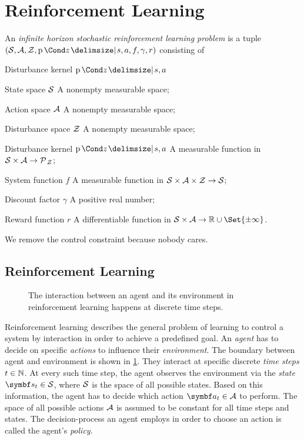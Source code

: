 \section{Reinforcement Learning}
\label{sec:reinforcement_learning:reinforcement_learning}
\parencite{bertsekas_stochastic_1978}

\begin{definition}
    An \emph{infinite horizon stochastic reinforcement learning problem} is a tuple $(\Sc, \Ac, \Zc, \Prob{z \given s, a}, f, \gamma, r)$ consisting of
    \begin{labeling}{Disturbance kernel $\Prob{z \given s, a}$\quad}
        \item[State space $\mathcal{S}$] A nonempty measurable space;
        \item[Action space $\mathcal{A}$] A nonempty measurable space;
        \item[Disturbance space $\mathcal{Z}$] A nonempty measurable space;
        \item[Disturbance kernel $\Prob{z \given s, a}$] A measurable function in $\mathcal{S} \times \mathcal{A} \to \operatorname{\mathcal{P}\mkern1mu}_{\mathcal{Z}}$;
        \item[System function $f$] A measurable function in  $\mathcal{S} \times \mathcal{A} \times \mathcal{Z} \to \mathcal{S}$;
        \item[Discount factor $\gamma$] A positive real number;
        \item[Reward function $r$] A differentiable function in $\Sc \times \Ac \to \Rb \cup \Set{\pm \infty}$.
    \end{labeling}
\end{definition}
We remove the control constraint because nobody cares.


\subsection{Reinforcement Learning}
\label{sub:reinforcement_learning:reinforcement_learning}
\begin{figure}[t]
    \centering
    
    \caption[Agent-environment interaction]{
        The interaction between an agent and its environment in reinforcement learning happens at discrete time steps.
    }
    \label{fig:reinforcement_learning:agent_environment_interaction}
\end{figure}
Reinforcement learning describes the general problem of learning to control a system by interaction in order to achieve a predefined goal.
An \emph{agent} has to decide on specific \emph{actions} to influence their \emph{environment}.
The boundary between agent and environment is shown in \cref{fig:reinforcement_learning:agent_environment_interaction}.
They interact at specific discrete \emph{time steps} $t \in \mathbb{N}$.
At every such time step, the agent observes the environment via the \emph{state} $\mat{s}_t \in \Sc$, where $\mathcal{S}$ is the space of all possible states.
Based on this information, the agent has to decide which action $\mat{a}_t \in \Ac$ to perform.
The space of all possible actions $\mathcal{A}$ is assumed to be constant for all time steps and states.
The decision-process an agent employs in order to choose an action is called the agent's \emph{policy}.

